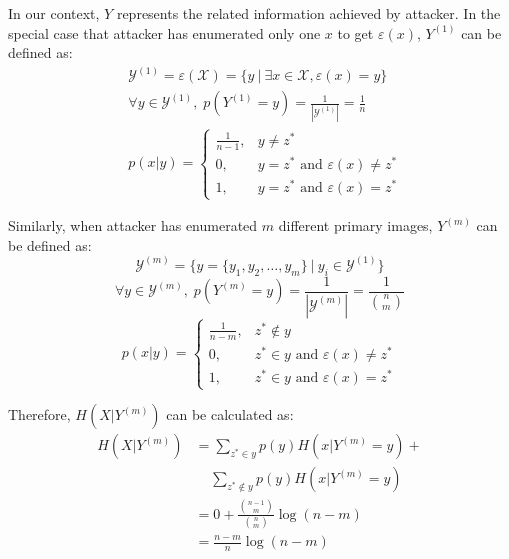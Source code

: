 \documentclass[10pt, conference, compsocconf]{IEEEtran}
\begin{document}
        In our context, $Y$ represents the related information
        achieved by attacker. In the special case that attacker has enumerated only one
        $x$ to get $\varepsilon(x)$, $Y^{(1)}$ can be defined as:
        \begin{align*}
            &\mathcal Y^{(1)} = \varepsilon(\mathcal X) = \{y \: | \: \exists x \in \mathcal X, \varepsilon(x) = y\}\\
            &\forall y \in \mathcal Y^{(1)}, \; p(Y^{(1)} = y) = \frac{1}{|\mathcal Y^{(1)}|} = \frac{1}{n}\\
            &p(x|y) = \begin{cases}
                \frac{1}{n-1}, &y \neq z^*\\
                0, &y = z^* \text{ and } \varepsilon(x) \neq z^*\\
                1, &y = z^* \text{ and } \varepsilon(x) = z^*
            \end{cases}
        \end{align*}

        Similarly, when attacker has enumerated $m$ different primary images, $Y^{(m)}$ can be defined
        as:
        \begin{equation*}
            \mathcal Y^{(m)} = \{ y = \{y_1, y_2, \ldots, y_m\} \: | \: y_i \in \mathcal Y^{(1)}\}
        \end{equation*}
        \begin{equation*}
            \forall y \in \mathcal Y^{(m)}, \; p(Y^{(m)} = y) = \frac{1}{|\mathcal Y^{(m)}|} = \frac{1}{\binom{n}{m}}
        \end{equation*}
        \begin{equation*}
            p(x|y) = \begin{cases}
                \frac{1}{n-m}, &z^* \notin y\\
                0, &z^* \in y \text{ and } \varepsilon(x) \neq z^*\\
                1, &z^* \in y \text{ and } \varepsilon(x) = z^*
            \end{cases}
        \end{equation*}

        Therefore, $H(X | Y^{(m)})$ can be calculated as:
        \begin{align*}
            H(X | Y^{(m)}) %
                &= \sum_{z^* \in y} p(y) H(x | Y^{(m)} = y) + \\
                    & \;\;\;\; \sum_{z^* \notin y} p(y) H(x | Y^{(m)} = y)\\
                &= 0+\frac{\binom{n-1}{m}}{\binom{n}{m}} \log(n-m)\\
                &= \frac{n-m}{n} \log(n-m)
        \end{align*}
\end{document}
